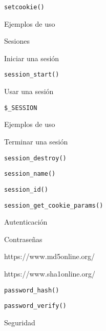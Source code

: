 \begin{longenum}
\begin{longenum}
        \begin{longenum}
            \item \texttt{setcookie()}
            \item Ejemplos de uso
        \end{longenum}
        \item Sesiones
        \begin{longenum}
            \item Iniciar una sesión
            \begin{longenum}
                \item \texttt{session\_start()}
            \end{longenum}
            \item Usar una sesión
            \begin{longenum}
                \item \texttt{\$\_SESSION}
                \item Ejemplos de uso
            \end{longenum}
            \item Terminar una sesión
            \begin{longenum}
                \item \texttt{session\_destroy()}
                \item \texttt{session\_name()}
                \item \texttt{session\_id()}
                \item \texttt{session\_get\_cookie\_params()}
            \end{longenum}
        \end{longenum}
        \item Autenticación
        \begin{longenum}
            \item Contraseñas
            \begin{longenum}
                \item https://www.md5online.org/
                \item https://www.sha1online.org/
                \item \texttt{password\_hash()}
                \item \texttt{password\_verify()}
            \end{longenum}
        \end{longenum}
        \item Seguridad
        \begin{longenum}

\end{longenum}
\end{longenum}
\end{longenum}
